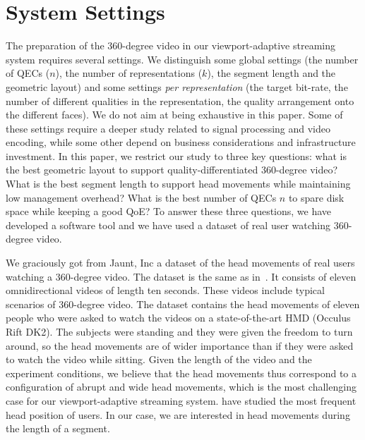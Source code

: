 \newcommand\testBitrateBudget{7}
\section{System Settings}
\label{sec:settings}

The preparation of the 360-degree video in our viewport-adaptive streaming system
requires several settings. We distinguish some global settings (the number of \acp{QEC} ($n$),
the number of representations ($k$), the segment length and the geometric layout)
and some settings \emph{per representation}
(the target bit-rate, the number of different qualities in the representation, the quality
arrangement onto the different
faces). We do not aim
at being exhaustive in this paper. Some of these settings require a deeper study related to
signal processing and video encoding, while some other depend on business considerations and infrastructure investment. In this paper, we restrict our study
to three key questions: what is the best geometric layout to support quality-differentiated 360-degree
video? What is the best segment length to support head movements while maintaining low
management overhead? What is the best number of \acp{QEC} $n$ to spare disk space while keeping a good \ac{QoE}? To answer these three questions,
we have developed a software tool and we have used a dataset of real user watching 360-degree
video.


We graciously got from Jaunt, Inc a dataset of the head movements
of real users watching a 360-degree video. The dataset is the same as
in~\cite{yu_framework_2015}. It consists of
eleven omnidirectional videos of length ten seconds. These videos include
typical scenarios of 360-degree video. The dataset contains
the head movements of eleven people who were asked to watch the videos on
a state-of-the-art \ac{HMD} (Occulus Rift DK2). The subjects were
standing and they were given the freedom to turn around, so the head
movements are of wider importance than if they were asked to watch the
video while sitting. Given the length of the video and the experiment
conditions, we believe that the head movements thus correspond to a
configuration of abrupt and wide head movements, which is the most
challenging case for our viewport-adaptive streaming system.
\citet{yu_framework_2015} have studied the most frequent head position of users.
In our case, we are interested in head movements during the
length of a segment.

